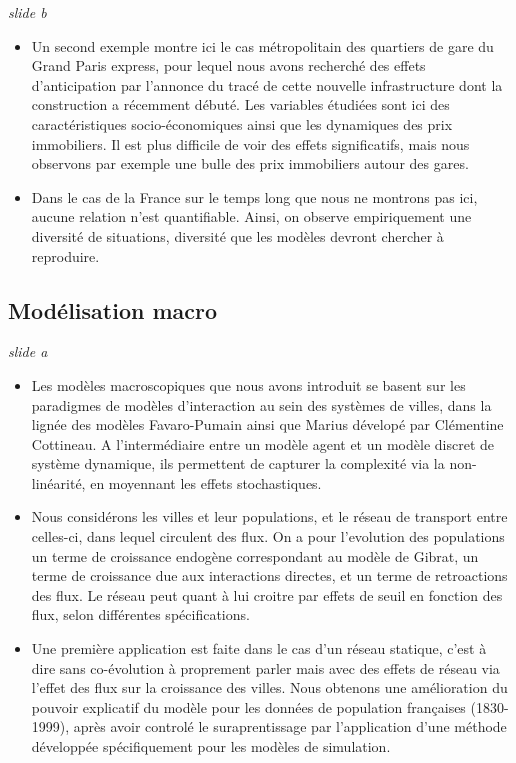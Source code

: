 \documentclass[11pt]{article}
\begin{document}
\textit{slide b}
	
\begin{itemize}
	\item Un second exemple montre ici le cas métropolitain des quartiers de gare du Grand Paris express, pour lequel nous avons recherché des effets d'anticipation par l'annonce du tracé de cette nouvelle infrastructure dont la construction a récemment débuté. Les variables étudiées sont ici des caractéristiques socio-économiques ainsi que les dynamiques des prix immobiliers. Il est plus difficile de voir des effets significatifs, mais nous observons par exemple une bulle des prix immobiliers autour des gares.
	\item Dans le cas de la France sur le temps long que nous ne montrons pas ici, aucune relation n'est quantifiable. Ainsi, on observe empiriquement une diversité de situations, diversité que les modèles devront chercher à reproduire.
\end{itemize}




\subsection*{Modélisation macro}



\textit{slide a}

\begin{itemize}
	\item Les modèles macroscopiques que nous avons introduit se basent sur les paradigmes de modèles d'interaction au sein des systèmes de villes, dans la lignée des modèles Favaro-Pumain ainsi que Marius dévelopé par Clémentine Cottineau. A l'intermédiaire entre un modèle agent et un modèle discret de système dynamique, ils permettent de capturer la complexité via la non-linéarité, en moyennant les effets stochastiques.
	\item Nous considérons les villes et leur populations, et le réseau de transport entre celles-ci, dans lequel circulent des flux. On a pour l'evolution des populations un terme de croissance endogène correspondant au modèle de Gibrat, un terme de croissance due aux interactions directes, et un terme de retroactions des flux. Le réseau peut quant à lui croitre par effets de seuil en fonction des flux, selon différentes spécifications.
	\item Une première application est faite dans le cas d'un réseau statique, c'est à dire sans co-évolution à proprement parler mais avec des effets de réseau via l'effet des flux sur la croissance des villes. Nous obtenons une amélioration du pouvoir explicatif du modèle pour les données de population françaises (1830-1999), après avoir controlé le suraprentissage par l'application d'une méthode développée spécifiquement pour les modèles de simulation.
\end{itemize}
\end{document}
